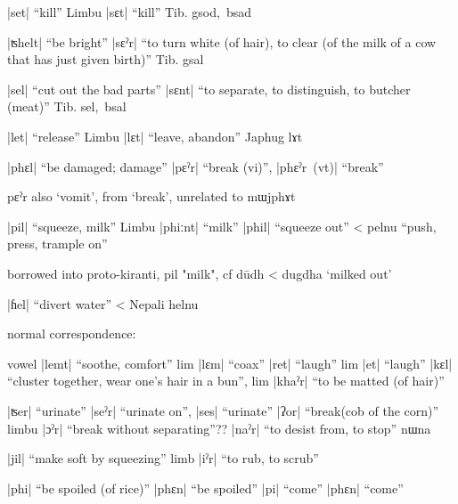 \documentclass[oldfontcommands,oneside,a4paper,11pt]{article}
\newcommand{\ipa}[1]{{\phon \mbox{#1}}} %
\newcommand{\dhatu}[2]{|\ipa{#1}| ``#2''}
\begin{document}
 

\dhatu{set}{kill} Limbu \dhatu{sɛt}{kill} Tib. \ipa{gsod, bsad}


\dhatu{ʦhelt}{be bright} \dhatu{sɛˀr}{to turn white (of hair), to clear (of the milk of a cow that has just given birth)} Tib. \ipa{gsal}


\dhatu{sel}{cut out the bad parts} \dhatu{sɛnt}{to separate, to distinguish, to butcher (meat)} Tib. \ipa{sel, bsal}

\dhatu{let}{release} Limbu \dhatu{lɛt}{leave, abandon} Japhug \ipa{lɤt}


\dhatu{phɛl}{be damaged; damage} \dhatu{pɛˀr}{break (vi)}, \dhatu{phɛˀr (vt)}{break}



\ipa{pɛˀr} also `vomit', from `break', unrelated to \ipa{mɯjphɤt}

\dhatu{pil}{squeeze, milk} Limbu \dhatu{phiːnt}{milk}
\dhatu{phil}{squeeze out}
< pelnu ``push, press, trample on''

borrowed into proto-kiranti, pil "milk", cf dūdh < dugdha `milked out'

\dhatu{ɦel}{divert water} < Nepali helnu


normal correspondence:

vowel
\dhatu{lemt}{soothe, comfort} lim \dhatu{lɛm}{coax}
\dhatu{ret}{laugh} lim \dhatu{et}{laugh}
\dhatu{kɛl}{cluster together, wear one's hair in a bun}, lim \dhatu{khaˀr}{to be matted (of hair)}

\dhatu{ʦer}{urinate} \dhatu{seˀr}{urinate on}, \dhatu{ses}{urinate}
\dhatu{ʔor}{break(cob of the corn)} limbu \dhatu{ɔˀr}{break without separating}??
\dhatu{naˀr}{to desist from, to stop}  \ipa{nɯna}

\dhatu{jil}{make soft by squeezing} limb \dhatu{iˀr}{to rub, to scrub}


\dhatu{phi}{be spoiled (of rice)} \dhatu{phɛn}{be spoiled}
\dhatu{pi}{come} \dhatu{phɛn}{come}




\end{document}
